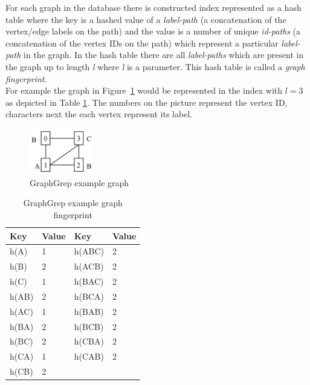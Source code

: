 For each graph in the database there is constructed index represented as a hash table where the key is a hashed value of a \textit{label-path} (a concatenation of the vertex/edge labels on the path) and the value is a number of unique \textit{id-paths} (a concatenation of the vertex IDs on the path) which represent a particular \textit{label-path} in the graph. In the hash table there are all \textit{label-paths} which are present in the graph up to length \textit{l} where \textit{l} is a parameter. This hash table is called a \textit{graph fingerprint}.\\

For example the graph in Figure~\ref{fig:graphgrep} would be represented in the index with $l=3$ as depicted in Table \ref{tab:graphgrep}. The numbers on the picture represent the vertex ID, characters next the each vertex represent its label.

\begin{figure}[h]
	\centering
	\includegraphics[width=0.25\textwidth]{../img/graphgrep.png}
	\caption{GraphGrep example graph}
	\label{fig:graphgrep}
\end{figure}

\begin{table}[h]
	\centering
	\renewcommand{\arraystretch}{2.5}
	\setlength{\arrayrulewidth}{0.5mm
	}
	\begin{tabular}[h!]{|p{3cm} p{3cm}|p{3cm} p{3cm}|}
		\hline
		\rowcolor{lightgray}
		Key & Value & Key & Value\\ \hline
		h(A) & 1 & h(ABC) & 2\\
		h(B) & 2 & h(ACB) & 2\\
		h(C) & 1 & h(BAC) & 2\\
		h(AB) & 2 & h(BCA) & 2\\
		h(AC) & 1 & h(BAB) & 2\\
		h(BA) & 2 & h(BCB) & 2\\
		h(BC) & 2 & h(CBA) & 2\\
		h(CA) & 1 & h(CAB) & 2\\
		h(CB) & 2 & & \\ \hline
	\end{tabular}
\caption{GraphGrep example graph fingerprint}
\label{tab:graphgrep}
\end{table}

